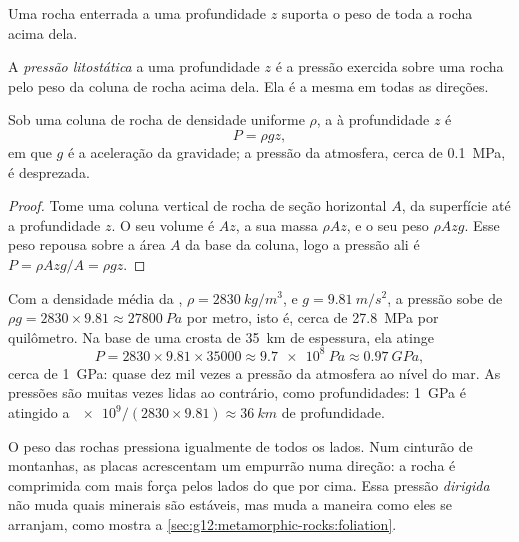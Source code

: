 Uma rocha enterrada a uma profundidade $z$ suporta o peso de toda a rocha
acima dela.

\begin{definition}\label{def:g12:metamorphic-rocks:lithostatic}
A \emph{pressão litostática} a uma profundidade $z$
é a pressão exercida sobre uma rocha pelo peso da coluna de rocha acima
dela. Ela é a mesma em todas as direções.
\end{definition}

\begin{proposition}\label{prop:g12:metamorphic-rocks:lithostatic}
Sob uma coluna de rocha de densidade uniforme $\rho$, a 
à profundidade $z$ é
\[
  P = \rho g z ,
\]
em que $g$ é a aceleração da gravidade; a pressão da atmosfera, cerca de
\qty{0.1}{MPa}, é desprezada.
\end{proposition}

\begin{proof}
Tome uma coluna vertical de rocha de seção horizontal $A$, da superfície
até a profundidade $z$. O seu volume é $Az$, a sua massa $\rho A z$, e o seu
peso $\rho A z g$. Esse peso repousa sobre a área $A$ da base da coluna,
logo a pressão ali é $P = \rho A z g / A = \rho g z$.
\end{proof}

Com a densidade média da , $\rho = \qty{2830}{kg/m^3}$, e
$g = \qty{9.81}{m/s^2}$, a pressão sobe de $\rho g = 2830 \times 9.81
\approx \qty{27800}{Pa}$ por metro, isto é, cerca de \qty{27.8}{MPa} por
quilômetro. Na base de uma crosta de \qty{35}{km} de espessura, ela atinge
\[
  P = 2830 \times 9.81 \times \num{35000} \approx \qty{9.7e8}{Pa} \approx
  \qty{0.97}{GPa},
\]
cerca de \qty{1}{GPa}: quase dez mil vezes a pressão da atmosfera ao nível
do mar. As pressões são muitas vezes lidas ao contrário, como
profundidades: \qty{1}{GPa} é atingido a
$\num{e9}/(2830 \times 9.81) \approx \qty{36}{km}$ de profundidade.

O peso das rochas pressiona igualmente de todos os lados. Num cinturão de
montanhas, as placas acrescentam um empurrão numa direção: a rocha é
comprimida com mais força pelos lados do que por cima. Essa pressão
\emph{dirigida} não muda quais minerais são estáveis, mas muda a maneira
como eles se arranjam, como mostra a \cref{sec:g12:metamorphic-rocks:foliation}.

